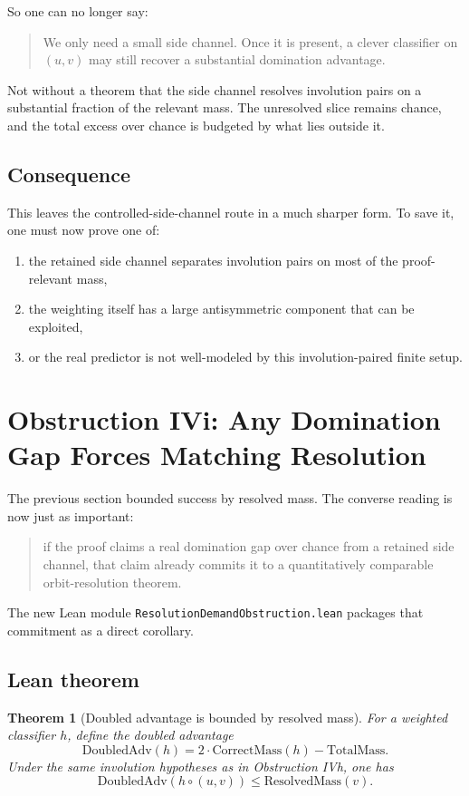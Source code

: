 \documentclass[11pt]{article}
\newtheorem{theorem}{Theorem}[section]
\theoremstyle{remark}
\begin{document}
So one can no longer say:
\begin{quote}
We only need a small side channel.  Once it is present, a clever classifier on \((u,v)\) may still
recover a substantial domination advantage.
\end{quote}

Not without a theorem that the side channel resolves involution pairs on a substantial fraction of
the relevant mass.  The unresolved slice remains chance, and the total excess over chance is budgeted
by what lies outside it.

\subsection{Consequence}

This leaves the controlled-side-channel route in a much sharper form.  To save it, one must now
prove one of:
\begin{enumerate}[leftmargin=1.5em]
  \item the retained side channel separates involution pairs on most of the proof-relevant mass,
  \item the weighting itself has a large antisymmetric component that can be exploited,
  \item or the real predictor is not well-modeled by this involution-paired finite setup.
\end{enumerate}

\section{Obstruction IVi: Any Domination Gap Forces Matching Resolution}

The previous section bounded success by resolved mass.  The converse reading is now just as
important:
\begin{quote}
if the proof claims a real domination gap over chance from a retained side channel, that claim
already commits it to a quantitatively comparable orbit-resolution theorem.
\end{quote}

The new Lean module \texttt{ResolutionDemandObstruction.lean} packages that commitment as a direct
corollary.

\subsection{Lean theorem}

\begin{theorem}[Doubled advantage is bounded by resolved mass]
For a weighted classifier \(h\), define the \emph{doubled advantage}
\[
  \mathrm{DoubledAdv}(h)
  =
  2 \cdot \mathrm{CorrectMass}(h) - \mathrm{TotalMass}.
\]
Under the same involution hypotheses as in Obstruction IVh, one has
\[
  \mathrm{DoubledAdv}(h \circ (u,v))
  \le
  \mathrm{ResolvedMass}(v).
\]
\end{theorem}
\end{document}
